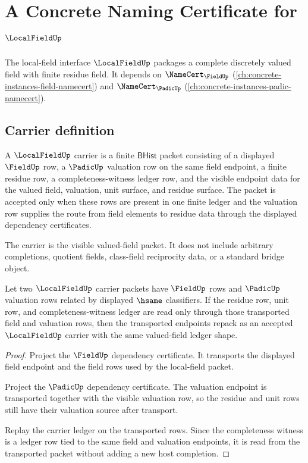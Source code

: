 \chapter{A Concrete Naming Certificate for $\LocalFieldUp$}
\label{ch:concrete-instances-localfield-namecert}

The local-field interface $\LocalFieldUp$ packages a complete discretely valued field with finite residue field. It depends on $\NameCert_{\FieldUp}$ (\autoref{ch:concrete-instances-field-namecert}) and $\NameCert_{\PadicUp}$ (\autoref{ch:concrete-instances-padic-namecert}).

\section{Carrier definition}
\label{sec:localfield-carrier}

\begin{definition}
\label{def:localfield-valued-bhist-carrier}
A $\LocalFieldUp$ carrier is a finite $\mathsf{BHist}$ packet consisting of a
displayed $\FieldUp$ row, a $\PadicUp$ valuation row on the same field
endpoint, a finite residue row, a completeness-witness ledger row, and the
visible endpoint data for the valued field, valuation, unit surface, and
residue surface. The packet is accepted only when these rows are present in
one finite ledger and the valuation row supplies the route from field elements
to residue data through the displayed dependency certificates.

The carrier is the visible valued-field packet. It does not include arbitrary
completions, quotient fields, class-field reciprocity data, or a standard
bridge object.
\end{definition}

\begin{theorem}
\label{thm:localfield-valuation-classifier-stability}
Let two $\LocalFieldUp$ carrier packets have $\FieldUp$ rows and $\PadicUp$
valuation rows related by displayed $\hsame$ classifiers. If the residue row,
unit row, and completeness-witness ledger are read only through those
transported field and valuation rows, then the transported endpoints repack as
an accepted $\LocalFieldUp$ carrier with the same valued-field ledger shape.
\end{theorem}
\begin{proof}
Project the $\FieldUp$ dependency certificate. It transports the displayed
field endpoint and the field rows used by the local-field packet.

Project the $\PadicUp$ dependency certificate. The valuation endpoint is
transported together with the visible valuation row, so the residue and unit
rows still have their valuation source after transport.

Replay the carrier ledger on the transported rows. Since the completeness
witness is a ledger row tied to the same field and valuation endpoints, it is
read from the transported packet without adding a new host completion.
\end{proof}

